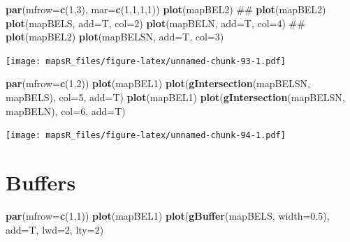 \documentclass[]{report}
\newenvironment{Shaded}{\begin{snugshade}}{\end{snugshade}}
\newcommand{\DataTypeTok}[1]{\textcolor[rgb]{0.13,0.29,0.53}{#1}}
\newcommand{\DecValTok}[1]{\textcolor[rgb]{0.00,0.00,0.81}{#1}}
\newcommand{\FloatTok}[1]{\textcolor[rgb]{0.00,0.00,0.81}{#1}}
\newcommand{\KeywordTok}[1]{\textcolor[rgb]{0.13,0.29,0.53}{\textbf{#1}}}
\newcommand{\NormalTok}[1]{#1}
\begin{document}
\begin{Shaded}
\begin{Highlighting}[]
\KeywordTok{par}\NormalTok{(}\DataTypeTok{mfrow=}\KeywordTok{c}\NormalTok{(}\DecValTok{1}\NormalTok{,}\DecValTok{3}\NormalTok{), }\DataTypeTok{mar=}\KeywordTok{c}\NormalTok{(}\DecValTok{1}\NormalTok{,}\DecValTok{1}\NormalTok{,}\DecValTok{1}\NormalTok{,}\DecValTok{1}\NormalTok{))}
\KeywordTok{plot}\NormalTok{(mapBEL2)}
\NormalTok{##}
\KeywordTok{plot}\NormalTok{(mapBEL2)}
\KeywordTok{plot}\NormalTok{(mapBELS, }\DataTypeTok{add=}\NormalTok{T, }\DataTypeTok{col=}\DecValTok{2}\NormalTok{)}
\KeywordTok{plot}\NormalTok{(mapBELN, }\DataTypeTok{add=}\NormalTok{T, }\DataTypeTok{col=}\DecValTok{4}\NormalTok{)}
\NormalTok{##}
\KeywordTok{plot}\NormalTok{(mapBEL2)}
\KeywordTok{plot}\NormalTok{(mapBELSN, }\DataTypeTok{add=}\NormalTok{T, }\DataTypeTok{col=}\DecValTok{3}\NormalTok{)}
\end{Highlighting}
\end{Shaded}

\texttt{[image: mapsR\_files/figure-latex/unnamed-chunk-93-1.pdf]}

\begin{Shaded}
\begin{Highlighting}[]
\KeywordTok{par}\NormalTok{(}\DataTypeTok{mfrow=}\KeywordTok{c}\NormalTok{(}\DecValTok{1}\NormalTok{,}\DecValTok{2}\NormalTok{))}
\KeywordTok{plot}\NormalTok{(mapBEL1)}
\KeywordTok{plot}\NormalTok{(}\KeywordTok{gIntersection}\NormalTok{(mapBELSN, mapBELS), }\DataTypeTok{col=}\DecValTok{5}\NormalTok{, }\DataTypeTok{add=}\NormalTok{T)}
\KeywordTok{plot}\NormalTok{(mapBEL1)}
\KeywordTok{plot}\NormalTok{(}\KeywordTok{gIntersection}\NormalTok{(mapBELSN, mapBELN), }\DataTypeTok{col=}\DecValTok{6}\NormalTok{, }\DataTypeTok{add=}\NormalTok{T)}
\end{Highlighting}
\end{Shaded}

\texttt{[image: mapsR\_files/figure-latex/unnamed-chunk-94-1.pdf]}

\hypertarget{buffers}{%
\section{Buffers}\label{buffers}}

\begin{Shaded}
\begin{Highlighting}[]
\KeywordTok{par}\NormalTok{(}\DataTypeTok{mfrow=}\KeywordTok{c}\NormalTok{(}\DecValTok{1}\NormalTok{,}\DecValTok{1}\NormalTok{))}
\KeywordTok{plot}\NormalTok{(mapBEL1)}
\KeywordTok{plot}\NormalTok{(}\KeywordTok{gBuffer}\NormalTok{(mapBELS, }\DataTypeTok{width=}\FloatTok{0.5}\NormalTok{), }\DataTypeTok{add=}\NormalTok{T, }\DataTypeTok{lwd=}\DecValTok{2}\NormalTok{, }\DataTypeTok{lty=}\DecValTok{2}\NormalTok{)}
\end{Highlighting}
\end{Shaded}
\end{document}
